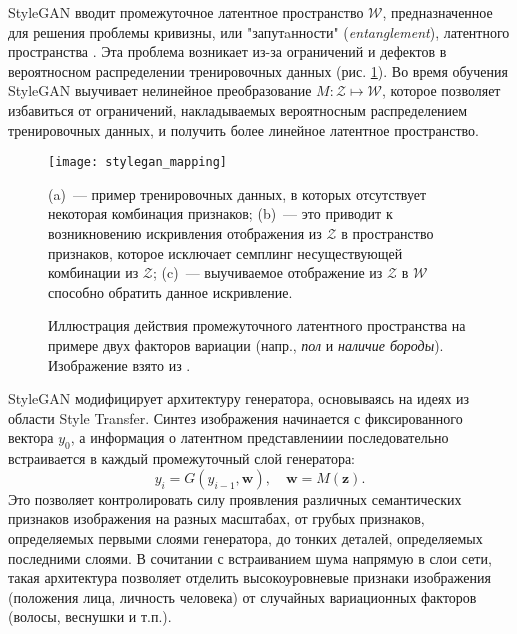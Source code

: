 StyleGAN вводит промежуточное латентное пространство $\mathcal W$, предназначенное для решения проблемы кривизны, или "запутaнности" \linebreak (\emph{entanglement}), латентного пространства \cite{arvanitidis2018oddity}. 
Эта проблема возникает из-за ограничений и дефектов в вероятносном распределении тренировочных данных (рис. \ref{fig:stylegan-mapping}). 
Во время обучения StyleGAN выучивает нелинейное преобразование $M: \mathcal Z \mapsto \mathcal W$, которое позволяет избавиться от ограничений, накладываемых вероятносным распределением тренировочных данных, и получить более линейное латентное пространство.

\begin{figure}[h]
\begin{center}
    \texttt{[image: stylegan\_mapping]}
    \caption{Иллюстрация действия промежуточного латентного пространства на примере двух факторов вариации (напр., \emph{пол} и \emph{наличие бороды}). Изображение взято из \cite{StyleGAN}.}
    \label{fig:stylegan-mapping}
    
    \footnotesize
 {(a)}~--- пример тренировочных данных, в которых отсутствует некоторая комбинация признаков; 
 {(b)}~--- это приводит к возникновению искривления отображения из $\mathcal Z$ в пространство признаков, которое исключает семплинг несуществующей комбинации из $\mathcal Z$;
 {(c)}~--- выучиваемое отображение из $\mathcal Z$ в $\mathcal W$ способно обратить данное искривление.

\end{center}
\end{figure}

StyleGAN модифицирует архитектуру генератора, основываясь на идеях из области Style Transfer. 
Синтез изображения начинается с фиксированного вектора $y_0$, а информация о латентном представлениии последовательно встраивается в каждый промежуточный слой генератора:
$$ y_i = G(y_{i-1}, \mathbf w),\quad \mathbf w = M(\mathbf z). $$
Это позволяет контролировать силу проявления различных семантических признаков изображения на разных масштабах, от грубых признаков, определяемых первыми слоями генератора, до тонких деталей, определяемых последними слоями.
В сочитании с встраиванием шума напрямую в слои сети, такая архитектура позволяет отделить высокоуровневые признаки изображения (положения лица, личность человека) от случайных вариационных факторов (волосы, веснушки и т.п.).


